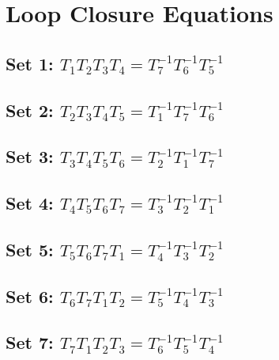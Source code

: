 \section{Loop Closure Equations}
\subsection{Set 1: $T_{1}T_{2}T_{3}T_{4} = T_{7}^{-1}T_{6}^{-1}T_{5}^{-1}$}
\subsection{Set 2: $T_{2}T_{3}T_{4}T_{5} = T_{1}^{-1}T_{7}^{-1}T_{6}^{-1}$}
\subsection{Set 3: $T_{3}T_{4}T_{5}T_{6} = T_{2}^{-1}T_{1}^{-1}T_{7}^{-1}$}
\subsection{Set 4: $T_{4}T_{5}T_{6}T_{7} = T_{3}^{-1}T_{2}^{-1}T_{1}^{-1}$}
\subsection{Set 5: $T_{5}T_{6}T_{7}T_{1} = T_{4}^{-1}T_{3}^{-1}T_{2}^{-1}$}
\subsection{Set 6: $T_{6}T_{7}T_{1}T_{2} = T_{5}^{-1}T_{4}^{-1}T_{3}^{-1}$}
\subsection{Set 7: $T_{7}T_{1}T_{2}T_{3} = T_{6}^{-1}T_{5}^{-1}T_{4}^{-1}$}
